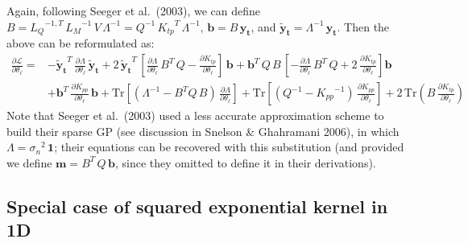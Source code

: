 \documentclass[11pt,a4paper]{article}
\newcommand{\tr}{\text{Tr}}
\numberwithin{equation}{section}
\begin{document}
Again, following Seeger et al.~(2003), we can define $B = {L_Q}^{-1,T}\,{L_M}^{-1}\,V\,\Lambda^{-1} = Q^{-1}\,{K_{tp}}^T\,\Lambda^{-1}$, $\mathbf{b} = B\,\mathbf{y_t}$, and $\mathbf{\tilde{y}_t} = \Lambda^{-1}\,\mathbf{y_t}$. Then the above can be reformulated as:
\begin{align}
\frac{\partial \mathcal{L}}{\partial \theta_\ell} =
  &-\mathbf{\tilde{y}_t}^T\,\frac{\partial \Lambda}{\partial \theta_\ell}\,\mathbf{\tilde{y}_t} + 2\,\mathbf{\tilde{y}_t}^T\,\left[\frac{\partial \Lambda}{\partial \theta_\ell}\,B^T\,Q - \frac{\partial K_{tp}}{\partial \theta_\ell}\right]\,\mathbf{b} + \mathbf{b}^T\,Q\,B\,\left[-\frac{\partial \Lambda}{\partial \theta_\ell}\,B^T\,Q + 2\,\frac{\partial K_{tp}}{\partial \theta_\ell}\right]\mathbf{b} \nonumber \\
  &+\mathbf{b}^T\,\frac{\partial K_{pp}}{\partial \theta_\ell}\,\mathbf{b} + \tr\left[\left(\Lambda^{-1} - B^T Q\,B\right)\,\frac{\partial \Lambda}{\partial \theta_\ell}\right] + \tr\left[\left(Q^{-1} - {K_{pp}}^{-1}\right)\,\frac{\partial K_{pp}}{\partial \theta_\ell}\right] + 2\,\tr\left(B\,\frac{\partial K_{tp}}{\partial \theta_\ell}\right)
\end{align}
Note that Seeger et al.~(2003) used a less accurate approximation scheme to build their sparse GP (see discussion in Snelson \& Ghahramani 2006), in which $\Lambda = {\sigma_n}^{2}\,{\bm 1}$; their equations can be recovered with this substitution (and provided we define $\mathbf{m} = B^T\,Q\,\mathbf{b}$, since they omitted to define it in their derivations).

\subsection{Special case of squared exponential kernel in 1D}
\end{document}
